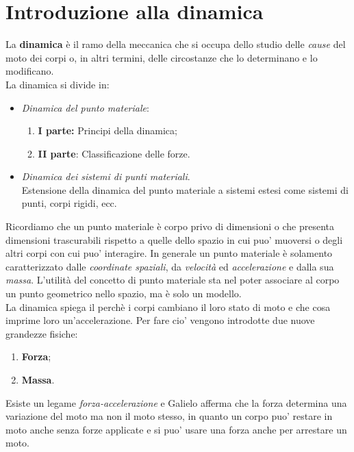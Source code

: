 \documentclass[12pt]{report}
\begin{document}
	\section{Introduzione alla dinamica}
	La \textbf{dinamica} è  il ramo della meccanica che si occupa dello studio delle \textit{cause} del moto dei corpi o, in altri termini, delle circostanze che lo determinano e lo modificano.\\
	La dinamica si divide in:
	\begin{itemize}
		\item \textit{Dinamica del punto materiale}:
		\begin{enumerate}
			\item \textbf{I parte:} Principi della dinamica;
			\item \textbf{II parte}: Classificazione delle forze.
		\end{enumerate}
		\item \textit{Dinamica dei sistemi di punti materiali}. \\
		Estensione della dinamica del punto materiale a sistemi estesi come sistemi di punti, corpi rigidi, ecc.
	\end{itemize}
	Ricordiamo che un punto materiale è  corpo privo di dimensioni o che presenta dimensioni trascurabili rispetto a quelle dello spazio in cui puo' muoversi o degli altri corpi con cui puo' interagire. In generale un punto materiale è  solamento caratterizzato dalle \textit{coordinate spaziali}, da \textit{velocità} ed \textit{accelerazione} e dalla sua \textit{massa}. L'utilità del concetto di punto materiale sta nel poter associare al corpo un punto geometrico nello spazio, ma è  solo un modello. \\
	La dinamica spiega il perchè  i corpi cambiano il loro stato di moto e che cosa imprime loro un'accelerazione. Per fare cio' vengono introdotte due nuove grandezze fisiche:
	\begin{enumerate}
		\item \textbf{Forza};
		\item \textbf{Massa}.
	\end{enumerate}
	Esiste un legame \textit{forza-accelerazione} e Galielo afferma che la forza determina una variazione del moto ma non il moto stesso, in quanto un corpo puo' restare in moto anche senza forze applicate e si puo' usare una forza anche per arrestare un moto.
\end{document}
